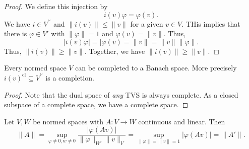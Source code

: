 \documentclass[prb,12pt]{revtex4-2}
\theoremstyle{definition}
\theoremstyle{definition}
\theoremstyle{definition}
\begin{document}
\begin{proof}
	We define this injection by
	\[
	i(v)\varphi = \varphi(v)
	.\] 
	We have $i\in V^{\prime\prime}$ and $\|i(v)\|\le \|v\|$ for a given $v\in V$. THis implies that there is $\varphi\in V'$ with $\|\varphi\|=1$ and $\varphi(v)=\|v\|$. Thus,
\[
|i(v)\varphi|=|\varphi(v)=\|v\|=\|v\|\|\varphi\|
.\] 
Thus, $\|i(v)\|\ge \|v\|$. Together, we have $\|i(v)\|\ge \|v\|$.
\end{proof}
\begin{Theorem}
	Every normed space $V$ can be completed to a Banach space. More precisely $i(v)^\text{cl}\subseteq V^{\prime\prime}$ is a completion.
\end{Theorem}
\begin{proof}
	Note that the dual space of \emph{any} TVS is always complete. As a closed subspace of a complete space, we have a complete space.
\end{proof}
\begin{Theorem}
	Let $V,W$ be normed spaces with $A:V \to W$ continuous and linear. Then
	\[
		\|A\|= \sup_{\varphi\neq 0, w \neq 0}\frac{|\varphi(A v)|}{\|\varphi\|_{W'}\|v\|_V}=\sup_{\|\varphi\|=\|v\|=1} |\varphi(A v)|=\|A'\|
	.\] 
\end{Theorem}
\end{document}
